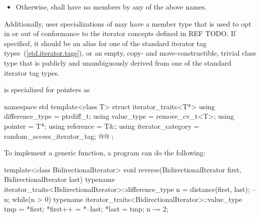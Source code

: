 \begin{itemize}

\item
Otherwise, 
shall have no members by any of the above names.
\end{itemize}

\begin{addedblock}
\pnum
Additionally, user specializations of  may have a member
type  that is used to opt in or out of conformance to the
iterator concepts defined in REF TODO. If specified, it should be an alias for
one of the standard iterator tag types~(\ref{std.iterator.tags}), or an empty,
copy- and move-constructible, trivial class type that is publicly and
unambiguously derived from one of the standard iterator tag types.
\end{addedblock}

\pnum
{} is specialized for pointers as

\begin{codeblock}
namespace std {
  template<class T> struct iterator_traits<T*> {
    using difference_type   = ptrdiff_t;
    using value_type        = remove_cv_t<T>;
    using pointer           = T*;
    using reference         = T&;
    using iterator_category = random_access_iterator_tag;
    @@
  };
}
\end{codeblock}

\pnum
\begin{example}
To implement a generic
function, a \Cpp{} program can do the following:

\begin{codeblock}
template<class BidirectionalIterator>
void reverse(BidirectionalIterator first, BidirectionalIterator last) {
  typename iterator_traits<BidirectionalIterator>::difference_type n =
    distance(first, last);
  --n;
  while(n > 0) {
    typename iterator_traits<BidirectionalIterator>::value_type
     tmp = *first;
    *first++ = *--last;
    *last = tmp;
    n -= 2;
  }
}
\end{codeblock}
\end{example}


